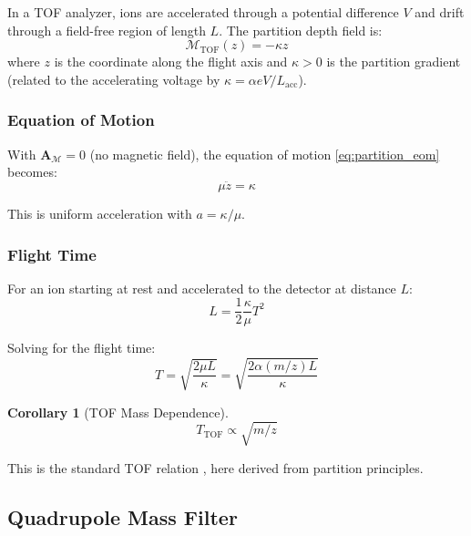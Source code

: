 \documentclass[twocolumn,10pt,a4paper]{article}
\newtheorem{corollary}[theorem]{Corollary}
\theoremstyle{definition}
\theoremstyle{remark}
\newcommand{\Mdepth}{\mathcal{M}}
\newcommand{\Apartition}{\mathbf{A}_{\mathcal{M}}}
\newcommand{\partinert}{\mu}
\begin{document}
In a TOF analyzer, ions are accelerated through a potential difference $V$ and drift through a field-free region of length $L$. The partition depth field is:
\begin{equation}
    \Mdepth_{\mathrm{TOF}}(z) = -\kappa z
    \label{eq:tof_field}
\end{equation}
where $z$ is the coordinate along the flight axis and $\kappa > 0$ is the partition gradient (related to the accelerating voltage by $\kappa = \alpha e V / L_{\mathrm{acc}}$).

\subsubsection{Equation of Motion}

With $\Apartition = 0$ (no magnetic field), the equation of motion \eqref{eq:partition_eom} becomes:
\begin{equation}
    \partinert\ddot{z} = \kappa
    \label{eq:tof_eom}
\end{equation}

This is uniform acceleration with $a = \kappa/\partinert$.

\subsubsection{Flight Time}

For an ion starting at rest and accelerated to the detector at distance $L$:
\begin{equation}
    L = \frac{1}{2}\frac{\kappa}{\partinert}T^2
\end{equation}

Solving for the flight time:
\begin{equation}
    T = \sqrt{\frac{2\partinert L}{\kappa}} = \sqrt{\frac{2\alpha(m/z)L}{\kappa}}
    \label{eq:tof_time}
\end{equation}

\begin{corollary}[TOF Mass Dependence]
\begin{equation}
    \boxed{T_{\mathrm{TOF}} \propto \sqrt{m/z}}
\end{equation}
\end{corollary}

This is the standard TOF relation \citep{wiley1955}, here derived from partition principles.

\subsection{Quadrupole Mass Filter}
\end{document}
